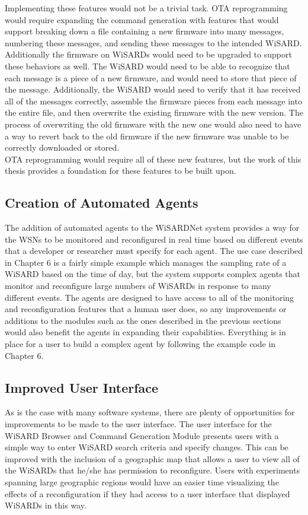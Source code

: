 Implementing these features would not be a trivial task. OTA reprogramming would require expanding the command generation with features that would support breaking down a file containing a new firmware into many messages, numbering these messages, and sending these messages to the intended WiSARD. Additionally the firmware on WiSARDs would need to be upgraded to support these behaviors as well. The WiSARD would need to be able to recognize that each message is a piece of a new firmware, and would need to store that piece of the message. Additionally, the WiSARD would need to verify that it has received all of the messages correctly, assemble the firmware pieces from each message into the entire file, and then overwrite the existing firmware with the new version. The process of overwriting the old firmware with the new one would also need to have a way to revert back to the old firmware if the new firmware was unable to be correctly downloaded or stored.\\

OTA reprogramming would require all of these new features, but the work of this thesis provides a foundation for these features to be built upon. 

\subsection{Creation of Automated Agents}
The addition of automated agents to the WiSARDNet system provides a way for the WSNs to be monitored and reconfigured in real time based on different events that a developer or researcher must specify for each agent. The use case described in Chapter 6 is a fairly simple example which manages the sampling rate of a WiSARD based on the time of day, but the system supports complex agents that monitor and reconfigure large numbers of WiSARDs in response to many different events. The agents are designed to have access to all of the monitoring and reconfiguration features that a human user does, so any improvements or additions to the modules such as the ones described in the previous sections would also benefit the agents in expanding their capabilities. Everything is in place for a user to build a complex agent by following the example code in Chapter 6.\\

\subsection{Improved User Interface}
As is the case with many software systems, there are plenty of opportunities for improvements to be made to the user interface. The user interface for the WiSARD Browser and Command Generation Module presents users with a simple way to enter WiSARD search criteria and specify changes. This can be improved with the inclusion of a geographic map that allows a user to view all of the WiSARDs that he/she has permission to reconfigure. Users with experiments spanning large geographic regions would have an easier time visualizing the effects of a reconfiguration if they had access to a user interface that displayed WiSARDs in this way.\\

